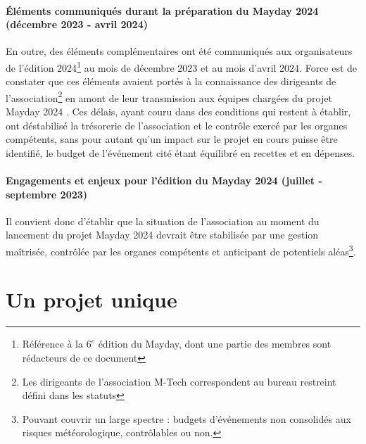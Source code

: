 \documentclass[12pt,a4paper]{report}
\begin{document}
\paragraph*{Éléments communiqués durant la préparation du Mayday 2024 (décembre 2023 - avril 2024)}
En outre, des éléments complémentaires ont été communiqués aux organisateurs de l'édition 2024\footnote{Référence à la $6^e$ édition du Mayday, dont une partie des membres sont rédacteurs de ce document} au mois de décembre 2023 et au mois d'avril 2024. Force est de constater que ces éléments avaient portés à la connaissance des dirigeants de l'association\footnote{Les dirigeants de l'association M-Tech correspondent au bureau restreint défini dans les statuts} en amont de leur transmission aux équipes chargées du projet \og Mayday 2024 \fg{}. Ces délais, ayant couru dans des conditions qui restent à établir, ont déstabilisé la trésorerie de l'association et le contrôle exercé par les organes compétents, sans pour autant qu'un impact sur le projet en cours puisse être identifié, le budget de l'événement cité étant équilibré en recettes et en dépenses.

\paragraph*{Engagements et enjeux pour l'édition du Mayday 2024 (juillet - septembre 2023)}
Il convient donc d'établir que la situation de l'association au moment du lancement du projet \og Mayday 2024 \fg{} devrait être stabilisée par une gestion maîtrisée, contrôlée par les organes compétents et anticipant de potentiels aléas\footnote{Pouvant couvrir un large spectre : budgets d'événements non consolidés aux risques météorologique, contrôlables ou non.}.

\section*{Un projet unique}
\end{document}
